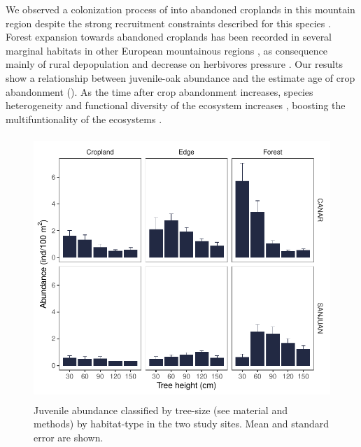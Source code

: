 We observed a colonization process of \Qpy into abandoned croplands in this mountain region despite the strong recruitment constraints described for this species \autocites{Bravoetal2008SelviculturaMontes,Gomez2003ImpactVertebrate,Pereaetal2014InteraccionesPlantaanimal}. Forest expansion towards abandoned croplands has been recorded in several marginal habitats in other European mountainous regions \autocites{Amezteguietal2016LanduseLegacies,Nataleetal2007StudyTree,Piussi2000ExpansionEuropean,Amezteguietal2010LanduseChanges,LasantaMartinezetal2005MountainMediterranean,Kozak2003ForestCover,AlvarezMartinezetal2014InfluenceLand,VicenteSerranoetal2004AnalysisSpatial}, as consequence mainly of rural depopulation and decrease on herbivores pressure \autocite{MacDonaldetal2000AgriculturalAbandonment,EuropeanEnvironmentAgency2016EuropeanForest}. Our results show a relationship between juvenile-oak abundance and the estimate age of crop abandonment (). As the time after crop abandonment increases, species heterogeneity and functional diversity of the ecosystem increases \autocites{PuertaPineroetal2012HistoryMatters,HermyVerheyen2007LegaciesPresentday}, boosting the multifuntionality of the ecosystems \autocite{CruzAlonsoetal2019LongTerm}. 

\begin{figure}
    \centering
    \includegraphics[width=\textwidth,height=10cm,
  keepaspectratio]{img/coloniza/coloniza-TreeCategory.pdf}
    \caption{Juvenile abundance classified by tree-size (see material and methods) by habitat-type in the two study sites. Mean and standard error are shown.}
    \label{fig:coloniza:treeCategory}
\end{figure}

